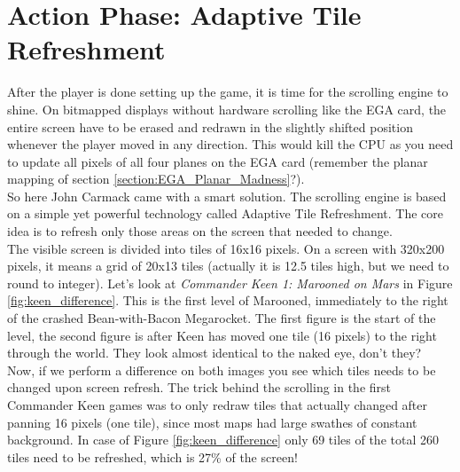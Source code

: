 \documentclass[book.tex]{subfiles}
\begin{document}
\section{Action Phase: Adaptive Tile Refreshment}
\label{section:adaptive_tile_refresh}
After the player is done setting up the game, it is time for the scrolling engine to shine. On bitmapped displays without hardware scrolling like the EGA card, the entire screen have to be erased and redrawn in the slightly shifted position whenever the player moved in any direction. This would kill the CPU as you need to update all pixels of all four planes on the EGA card (remember the planar mapping of section \ref{section:EGA_Planar_Madness}?).\\ 

So here John Carmack came with a smart solution. The scrolling engine is based on a simple yet powerful technology called Adaptive Tile Refreshment. The core idea is to  refresh only those areas on the screen that needed to change.\\

The visible screen is divided into tiles of 16x16 pixels. On a screen with 320x200 pixels, it means a grid of 20x13 tiles (actually it is 12.5 tiles high, but we need to round to integer). Let's look at \textit{Commander Keen 1: Marooned on Mars} in Figure \ref{fig:keen_difference}. This is the first level of Marooned, immediately to the right of the crashed Bean-with-Bacon Megarocket. The first figure is the start of the level, the second figure is after Keen has moved one tile (16 pixels) to the right through the world. They look almost identical to the naked eye, don't they? \\

Now, if we perform a difference on both images you see which tiles needs to be changed upon screen refresh. The trick behind the scrolling in the first Commander Keen games was to only redraw tiles that actually changed after panning 16 pixels (one tile), since most maps had large swathes of constant background. In case of Figure \ref{fig:keen_difference} only 69 tiles of the total 260 tiles need to be refreshed, which is 27\% of the screen! 
\end{document}
